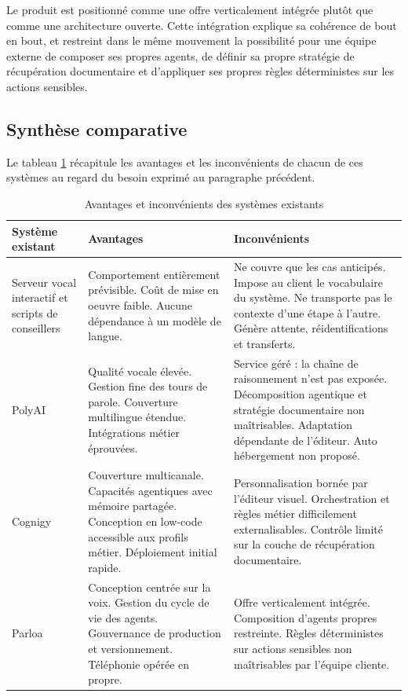 Le produit est positionné comme une offre verticalement intégrée plutôt que comme une architecture ouverte. Cette intégration explique sa cohérence de bout en bout, et restreint dans le même mouvement la possibilité pour une équipe externe de composer ses propres agents, de définir sa propre stratégie de récupération documentaire et d'appliquer ses propres règles déterministes sur les actions sensibles.

\subsection{Synthèse comparative}

Le tableau \ref{tab:existant} récapitule les avantages et les inconvénients de chacun de ces systèmes au regard du besoin exprimé au paragraphe précédent.

\begin{table}[H]
\centering
\renewcommand{\arraystretch}{1.25}
\begin{tabular}{|p{3.2cm}|p{5.4cm}|p{5.4cm}|}
\hline
\textbf{Système existant} & \textbf{Avantages} & \textbf{Inconvénients} \\
\hline
Serveur vocal interactif et scripts de conseillers
& Comportement entièrement prévisible. Coût de mise en oeuvre faible. Aucune dépendance à un modèle de langue.
& Ne couvre que les cas anticipés. Impose au client le vocabulaire du système. Ne transporte pas le contexte d'une étape à l'autre. Génère attente, réidentifications et transferts. \\
\hline
PolyAI
& Qualité vocale élevée. Gestion fine des tours de parole. Couverture multilingue étendue. Intégrations métier éprouvées.
& Service géré : la chaîne de raisonnement n'est pas exposée. Décomposition agentique et stratégie documentaire non maîtrisables. Adaptation dépendante de l'éditeur. Auto hébergement non proposé. \\
\hline
Cognigy
& Couverture multicanale. Capacités agentiques avec mémoire partagée. Conception en low-code accessible aux profils métier. Déploiement initial rapide.
& Personnalisation bornée par l'éditeur visuel. Orchestration et règles métier difficilement externalisables. Contrôle limité sur la couche de récupération documentaire. \\
\hline
Parloa
& Conception centrée sur la voix. Gestion du cycle de vie des agents. Gouvernance de production et versionnement. Téléphonie opérée en propre.
& Offre verticalement intégrée. Composition d'agents propres restreinte. Règles déterministes sur actions sensibles non maîtrisables par l'équipe cliente. \\
\hline
\end{tabular}
\caption{Avantages et inconvénients des systèmes existants}
\label{tab:existant}
\end{table}

